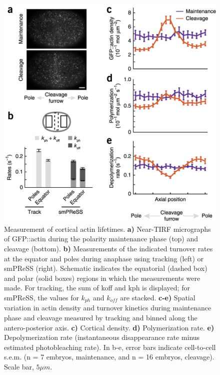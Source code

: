 \begin{figure}[H]
	\centering
	\includegraphics[width=0.8\hsize]{nmeth/nmethF4.jpg}
	\caption{\label{fig:meas_div}Measurement of cortical actin lifetimes.  \textbf{a)} Near-TIRF micrographs of GFP::actin during the polarity maintenance phase (top) and cleavage (bottom). \textbf{b)} Measurements of the indicated turnover rates at the equator and poles during anaphase using tracking (left) or smPReSS (right). Schematic indicates the equatorial (dashed box) and polar (solid boxes) regions in which the measurements were made. For tracking, the sum of koff and kph is displayed; for smPReSS, the values for $k_{ph}$ and $k_{off}$ are stacked. \textbf{c-e)} Spatial variation in actin density and turnover kinetics during maintenance phase and cleavage measured by tracking and binned along the antero-posterior axis. \textbf{c)} Cortical density. \textbf{d)} Polymerization rate. \textbf{e)} Depolymerization rate (instantaneous disappearance rate minus estimated photobleaching rate). In b-e, error bars indicate cell-to-cell s.e.m. (n = 7 embryos, maintenance, and n = 16 embryos, cleavage). Scale bar, $5 \mu m$.} 
	
\end{figure}